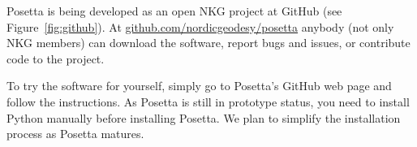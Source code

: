 Posetta is being developed as an open NKG project at GitHub (see Figure~\ref{fig:github}). At \url{github.com/nordicgeodesy/posetta} anybody (not only NKG members) can download the software, report bugs and issues, or contribute code to the project.

To try the software for yourself, simply go to Posetta's GitHub web page and follow the instructions. As Posetta is still in prototype status, you need to install Python manually before installing Posetta. We plan to simplify the installation process as Posetta matures.

\endinput
